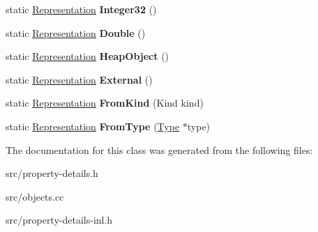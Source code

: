 \begin{DoxyCompactItemize}
\item 
\hypertarget{classv8_1_1internal_1_1_representation_a8ebdb3d2ad2e45a01e769410bd620a3f}{}static \hyperlink{classv8_1_1internal_1_1_representation}{Representation} {\bfseries Integer32} ()\label{classv8_1_1internal_1_1_representation_a8ebdb3d2ad2e45a01e769410bd620a3f}

\item 
\hypertarget{classv8_1_1internal_1_1_representation_a2601764cfa13d6944d909d8c26fad1f3}{}static \hyperlink{classv8_1_1internal_1_1_representation}{Representation} {\bfseries Double} ()\label{classv8_1_1internal_1_1_representation_a2601764cfa13d6944d909d8c26fad1f3}

\item 
\hypertarget{classv8_1_1internal_1_1_representation_aa620b108401d1d5396ca2cf81e85614f}{}static \hyperlink{classv8_1_1internal_1_1_representation}{Representation} {\bfseries Heap\+Object} ()\label{classv8_1_1internal_1_1_representation_aa620b108401d1d5396ca2cf81e85614f}

\item 
\hypertarget{classv8_1_1internal_1_1_representation_a58aecc078db837eced69a71cd9716360}{}static \hyperlink{classv8_1_1internal_1_1_representation}{Representation} {\bfseries External} ()\label{classv8_1_1internal_1_1_representation_a58aecc078db837eced69a71cd9716360}

\item 
\hypertarget{classv8_1_1internal_1_1_representation_ae358bed6c0e672849eed8ae0dd4b1a7a}{}static \hyperlink{classv8_1_1internal_1_1_representation}{Representation} {\bfseries From\+Kind} (Kind kind)\label{classv8_1_1internal_1_1_representation_ae358bed6c0e672849eed8ae0dd4b1a7a}

\item 
\hypertarget{classv8_1_1internal_1_1_representation_a105b61648be9479a42905edf202cfb93}{}static \hyperlink{classv8_1_1internal_1_1_representation}{Representation} {\bfseries From\+Type} (\hyperlink{classv8_1_1internal_1_1_type_impl}{Type} $\ast$type)\label{classv8_1_1internal_1_1_representation_a105b61648be9479a42905edf202cfb93}

\end{DoxyCompactItemize}


The documentation for this class was generated from the following files\+:\begin{DoxyCompactItemize}
\item 
src/property-\/details.\+h\item 
src/objects.\+cc\item 
src/property-\/details-\/inl.\+h\end{DoxyCompactItemize}
